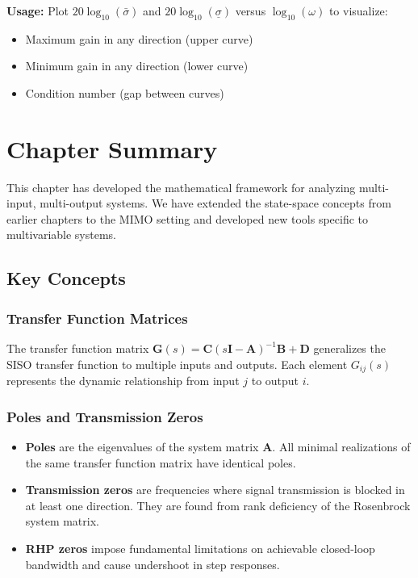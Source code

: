 \textbf{Usage:} Plot $20\log_{10}(\bar{\sigma})$ and $20\log_{10}(\underline{\sigma})$ versus $\log_{10}(\omega)$ to visualize:
\begin{itemize}
\item Maximum gain in any direction (upper curve)
\item Minimum gain in any direction (lower curve)
\item Condition number (gap between curves)
\end{itemize}


\section{Chapter Summary}
\label{sec:chapter_summary}

This chapter has developed the mathematical framework for analyzing multi-input, multi-output systems. We have extended the state-space concepts from earlier chapters to the MIMO setting and developed new tools specific to multivariable systems.

\subsection{Key Concepts}

\subsubsection{Transfer Function Matrices}

The transfer function matrix $\mathbf{G}(s) = \mathbf{C}(s\mathbf{I} - \mathbf{A})^{-1}\mathbf{B} + \mathbf{D}$ generalizes the SISO transfer function to multiple inputs and outputs. Each element $G_{ij}(s)$ represents the dynamic relationship from input $j$ to output $i$.

\subsubsection{Poles and Transmission Zeros}

\begin{itemize}
\item \textbf{Poles} are the eigenvalues of the system matrix $\mathbf{A}$. All minimal realizations of the same transfer function matrix have identical poles.

\item \textbf{Transmission zeros} are frequencies where signal transmission is blocked in at least one direction. They are found from rank deficiency of the Rosenbrock system matrix.

\item \textbf{RHP zeros} impose fundamental limitations on achievable closed-loop bandwidth and cause undershoot in step responses.
\end{itemize}


